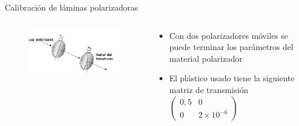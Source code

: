 \begin{frame}{Calibración de láminas polarizadoras}
        
        \begin{columns}
            \begin{column}{0.5\textwidth}
                \begin{figure}[H]
                \centering
                \includegraphics[width=\textwidth]{fig/polarimetro/calibracion}
                \label{fig:polarimetro_calibracion}
            \end{figure}
            \end{column}
            \begin{column}{0.5\textwidth}
                \begin{itemize}
                    \item Con dos polarizadores móviles se puede terminar los parámetros del material polarizador
                    \item El plástico usado tiene la siguiente matriz de transmisión $\begin{pmatrix} 0,5 & 0 \\ 0 & 2\times 10^{-6} \end{pmatrix}$
                \end{itemize}
            \end{column}
        \end{columns}
\end{frame}


